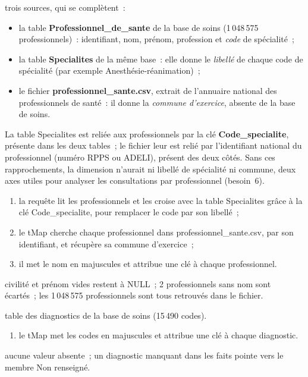   {trois sources, qui se complètent~:
  \begin{itemize}
	\item la table \textbf{Professionnel\_de\_sante} de la base de soins (1\,048\,575 professionnels)~: identifiant, nom, prénom, profession et \emph{code} de spécialité~;
	\item la table \textbf{Specialites} de la même base~: elle donne le \emph{libellé} de chaque code de spécialité (par exemple \og Anesthésie-réanimation\fg{})~;
	\item le fichier \textbf{professionnel\_sante.csv}, extrait de l'annuaire national des professionnels de santé~: il donne la \emph{commune d'exercice}, absente de la base de soins.
  \end{itemize}
  \vspace{0.1cm}\noindent La table Specialites est reliée aux professionnels par la clé \textbf{Code\_specialite}, présente dans les deux tables~; le fichier leur est relié par l'identifiant national du professionnel (numéro RPPS ou ADELI), présent des deux côtés. Sans ces rapprochements, la dimension n'aurait ni libellé de spécialité ni commune, deux axes utiles pour analyser les consultations par professionnel (besoin~6).}
  {
  \begin{enumerate}
	\item la requête lit les professionnels et les croise avec la table Specialites grâce à la clé Code\_specialite, pour remplacer le code par son libellé~;
	\item le tMap cherche chaque professionnel dans professionnel\_sante.csv, par son identifiant, et récupère sa commune d'exercice~;
	\item il met le nom en majuscules et attribue une clé à chaque professionnel.
  \end{enumerate}}
  {civilité et prénom vides restent à NULL~; 2 professionnels sans nom sont écartés~; les 1\,048\,575 professionnels sont tous retrouvés dans le fichier.}

  {table des diagnostics de la base de soins (15\,490 codes).}
  {
  \begin{enumerate}
	\item le tMap met les codes en majuscules et attribue une clé à chaque diagnostic.
  \end{enumerate}}
  {aucune valeur absente~; un diagnostic manquant dans les faits pointe vers le membre \og Non renseigné\fg{}.}

